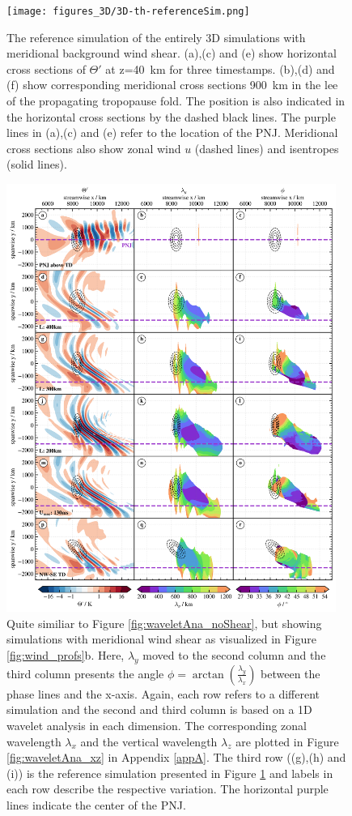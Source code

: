 \begin{figure}[tbp]
    \centering
    \texttt{[image: figures\_3D/3D-th-referenceSim.png]}
    \caption{The reference simulation of the entirely 3D simulations with meridional background wind shear. (a),(c) and (e) show horizontal cross sections of $\Theta'$ at z=\SI{40}{\kilo\meter} for three timestamps. (b),(d) and (f) show corresponding meridional cross sections \SI{900}{\kilo\meter} in the lee of the propagating tropopause fold. The position is also indicated in the horizontal cross sections by the dashed black lines. The purple lines in (a),(c) and (e) refer to the location of the PNJ. Meridional cross sections also show zonal wind $u$ (dashed lines) and isentropes (solid lines).}
    \label{fig:3D-reference}
\end{figure}
\begin{figure}[tbp]
    \centering
    \includegraphics[width=0.96\textwidth]{figures_3D/waveletAna_angle.png}
    \caption{Quite similiar to Figure \ref{fig:waveletAna_noShear}, but showing simulations with meridional wind shear as visualized in Figure \ref{fig:wind_profs}b. Here, $\lambda_y$ moved to the second column and the third column presents the angle $\phi=\arctan(\frac{\lambda_y}{\lambda_x})$ between the phase lines and the x-axis. Again, each row refers to a different simulation and the second and third column is based on a 1D wavelet analysis in each dimension. The corresponding zonal wavelength $\lambda_x$ and the vertical wavelength $\lambda_z$ are plotted in Figure \ref{fig:waveletAna_xz} in Appendix \ref{appA}. The third row ((g),(h) and (i)) is the reference simulation presented in Figure \ref{fig:3D-reference} and labels in each row describe the respective variation. The horizontal purple lines indicate the center of the PNJ.}

\end{figure}
